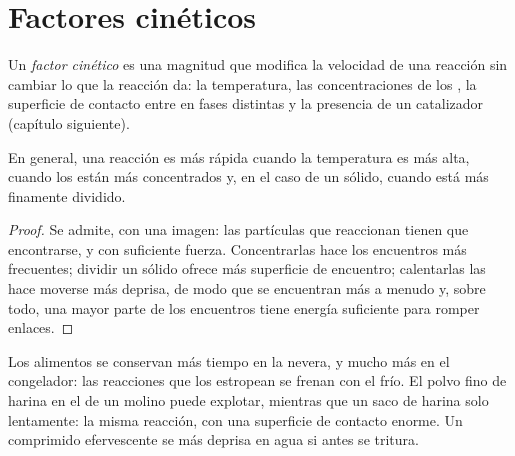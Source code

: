 \section{Factores cinéticos}

\begin{definition}\label{def:g12:reaction-rates:kinetic-factor}
Un \emph{factor cinético} es una magnitud que
modifica la velocidad de una reacción sin cambiar lo que la reacción da:
la temperatura, las concentraciones de los , la superficie de
contacto entre  en fases distintas y la presencia de un
catalizador (capítulo siguiente).
\end{definition}

\begin{proposition}\label{prop:g12:reaction-rates:factors}
En general, una reacción es más rápida cuando la temperatura es más
alta, cuando los  están más concentrados y, en el caso de un
 sólido, cuando está más finamente dividido.
\end{proposition}

\begin{proof}
Se admite, con una imagen: las partículas que reaccionan tienen que
encontrarse, y con suficiente fuerza. Concentrarlas hace los encuentros
más frecuentes; dividir un sólido ofrece más superficie de encuentro;
calentarlas las hace moverse más deprisa, de modo que se encuentran más a
menudo y, sobre todo, una mayor parte de los encuentros tiene energía
suficiente para romper enlaces.
\end{proof}

\begin{example}\label{ex:g12:reaction-rates:everyday}
Los alimentos se conservan más tiempo en la nevera, y mucho más en el
congelador: las reacciones que los estropean se frenan con el frío. El
polvo fino de harina en el  de un molino puede explotar, mientras que
un saco de harina solo  lentamente: la misma reacción, con una
superficie de contacto enorme. Un comprimido efervescente se 
más deprisa en agua si antes se tritura.
\end{example}

